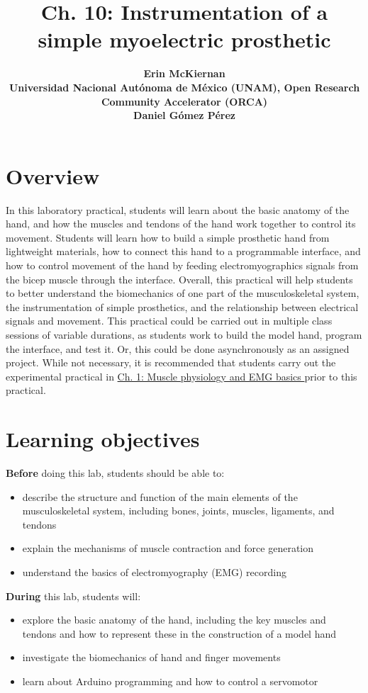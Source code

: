 \documentclass{article}
\title{Ch. 10: Instrumentation of a simple myoelectric prosthetic}
\date{\displaydate{articleDate}}
\author{\bfseries Erin McKiernan\mdseries\\Universidad Nacional Autónoma de México (UNAM), Open Research Community Accelerator (ORCA)\\\AND\bfseries Daniel Gómez Pérez\mdseries\\}
\begin{document}
\maketitle
\keywords{}

\section{Overview}

In this laboratory practical, students will learn about the basic anatomy of the hand, and how the muscles and tendons of the hand work together to control its movement. Students will learn how to build a simple prosthetic hand from lightweight materials, how to connect this hand to a programmable interface, and how to control movement of the hand by feeding electromyographics signals from the bicep muscle through the interface. Overall, this practical will help students to better understand the biomechanics of one part of the musculoskeletal system, the instrumentation of simple prosthetics, and the relationship between electrical signals and movement. This practical could be carried out in multiple class sessions of variable durations, as students work to build the model hand, program the interface, and test it. Or, this could be done asynchronously as an assigned project. While not necessary, it is recommended that students carry out the experimental practical in \href{https://curvenote.com/oxa:EPpXta8zJdzN048lz8AR/hZTnTYzQR5EQmCKX51Wj}{Ch. 1: Muscle physiology and EMG basics }prior to this practical.

\section{Learning objectives}

\textbf{Before} doing this lab, students should be able to:

\begin{itemize}
\item describe the structure and function of the main elements of the musculoskeletal system, including bones, joints, muscles, ligaments, and tendons
\item explain the mechanisms of muscle contraction and force generation
\item understand the basics of electromyography (EMG) recording
\end{itemize}

\textbf{During} this lab, students will:

\begin{itemize}
\item explore the basic anatomy of the hand, including the key muscles and tendons and how to represent these in the construction of a model hand
\item investigate the biomechanics of hand and finger movements
\item learn about Arduino programming and how to control a servomotor
\end{itemize}
\end{document}
